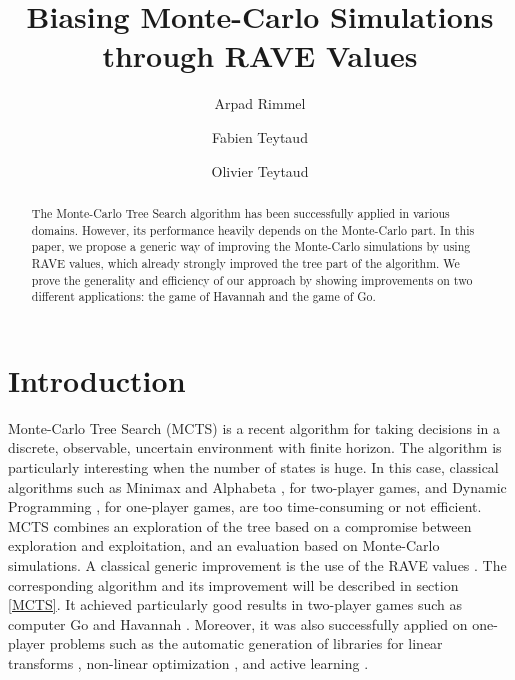 \documentclass{llncs}
\begin{document}
%

\title{Biasing Monte-Carlo Simulations through RAVE Values}
%
%
\author{Arpad Rimmel \and
	Fabien Teytaud \and
	Olivier Teytaud
}
%

\maketitle              %

\begin{abstract}
The Monte-Carlo Tree Search algorithm has been successfully applied in various domains. However, its performance heavily depends on the Monte-Carlo part. In this paper, we propose a generic way of improving the Monte-Carlo simulations by using RAVE values, which already strongly improved the tree part of the algorithm. We prove the generality and efficiency of our approach by showing improvements on two different applications: the game of Havannah and the game of Go. 
\end{abstract}
%
\section{Introduction}



Monte-Carlo Tree Search (MCTS) \cite{chaslot06a,coulom06,uct} is a recent algorithm for taking decisions in a discrete, observable, uncertain environment with finite horizon. The algorithm is particularly interesting when the number of states is huge.
In this case, classical algorithms such as Minimax and Alphabeta \cite{knuth1975analysis}, for two-player games, and Dynamic Programming \cite{adp}, for one-player games, are too time-consuming or not efficient. 
MCTS combines an exploration of the tree based on a compromise between exploration and exploitation, and an evaluation based on Monte-Carlo simulations. A classical generic improvement is the use of the RAVE values \cite{icmlmogo}. The corresponding algorithm and its improvement will be described in section \ref{MCTS}.
It achieved particularly good results in two-player games such as computer Go \cite{ieeemogo} and Havannah \cite{fabienHavannah}. Moreover, it was also successfully applied on one-player problems such as the automatic generation of libraries for linear transforms \cite{icmlrimmel}, non-linear optimization \cite{unleo}, and active learning \cite{roletecml}.
\end{document}
